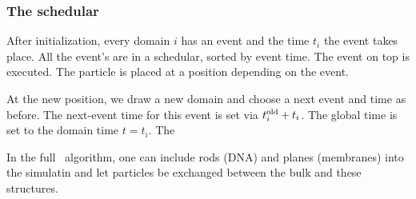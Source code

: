 \subsubsection{The schedular}
After initialization, every domain $i$ has an event and the time $t_i$ the event takes place. All the event's are in a schedular, sorted by event time. The event on top is executed. The particle is placed at a position depending on the event. 


At the new position, we draw a new domain and choose a next event and time as before. The next-event time for this event is set via $t^{\rm old}_i + t_i$. The global time is set to the domain time $t=t_i$. The 





In the full \GFRD\ algorithm, one can include rods (DNA) and planes (membranes) into the simulatin and let particles be exchanged between the bulk and these structures.









